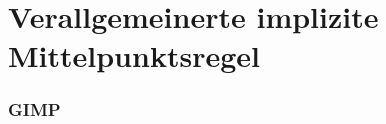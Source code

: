\section[Problemstellung]{Verallgemeinerte implizite Mittelpunktsregel}
\begin{frame}[<+->]
\frametitle{GIMP}
 

\end{frame}
